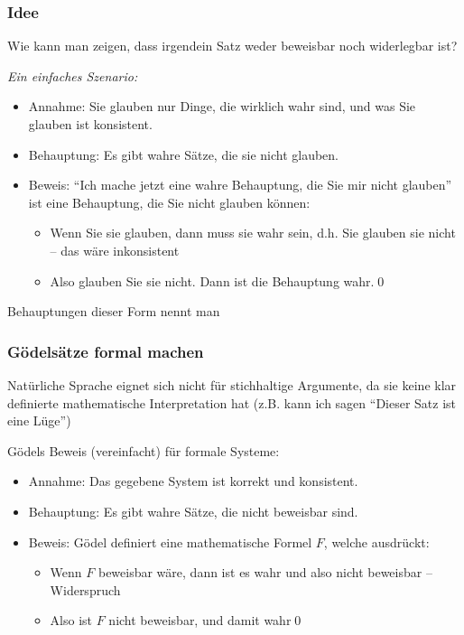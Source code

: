 \documentclass[aspectratio=1610,onlymath]{beamer}
\begin{document}
\begin{frame}\frametitle{Idee}

Wie kann man zeigen, dass irgendein Satz weder beweisbar noch widerlegbar ist?
\bigskip\pause

\emph{Ein einfaches Szenario:}
\begin{itemize}
\item \alert{Annahme:} Sie glauben nur Dinge, die wirklich wahr sind, und was Sie glauben ist konsistent.\pause
\item \alert{Behauptung:} Es gibt wahre Sätze, die sie nicht glauben.\pause
\item \alert{Beweis:}\pause{} "`Ich mache jetzt eine wahre Behauptung, die Sie mir nicht glauben"'\pause{} ist eine Behauptung, die Sie nicht glauben können:
\begin{itemize}
\item Wenn Sie sie glauben, dann muss sie wahr sein, d.h. Sie glauben sie nicht -- das wäre inkonsistent
\item Also glauben Sie sie nicht. Dann ist die Behauptung wahr.\qed
\end{itemize}
\end{itemize}

Behauptungen dieser Form nennt man 

\end{frame}

\begin{frame}\frametitle{Gödelsätze formal machen}

Natürliche Sprache eignet sich nicht für stichhaltige Argumente, da sie keine klar definierte mathematische Interpretation hat (z.B. kann ich sagen "`Dieser Satz ist eine Lüge"')
\bigskip\pause

Gödels Beweis (vereinfacht) für formale Systeme:
\begin{itemize}
\item \alert{Annahme:} Das gegebene System ist korrekt und konsistent.
\item \alert{Behauptung:} Es gibt wahre Sätze, die nicht beweisbar sind.
\item \alert{Beweis:} Gödel definiert eine mathematische Formel $F$, welche ausdrückt:\\[1ex]
\smallskip

\begin{itemize}
\item Wenn $F$ beweisbar wäre, dann ist es wahr und also nicht beweisbar -- Widerspruch
\item Also ist $F$ nicht beweisbar, und damit wahr\qed
\end{itemize}
\end{itemize}

\end{frame}
\end{document}
